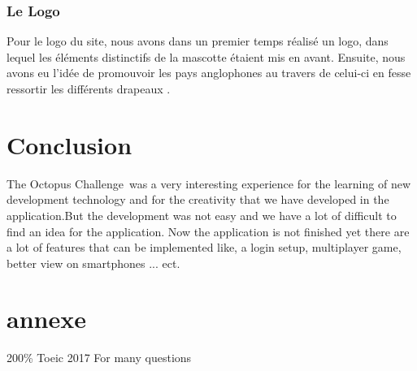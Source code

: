 \documentclass[a4paper,11pt, oneside]{book}
\def\appName{The Octopus Challenge}
\begin{document}
\subsection*{Le Logo}
Pour le logo du site, nous avons dans un premier temps réalisé un logo, dans lequel les éléments distinctifs de la mascotte étaient mis en avant.
Ensuite, nous avons eu l’idée de promouvoir les pays anglophones au travers de celui-ci en fesse ressortir les différents drapeaux .


\chapter{Conclusion}
\appName \ was a very interesting experience for the learning of new development technology and for the creativity that we have developed in the application.But the development was not easy and we have a lot of difficult to find an idea for the application. 
Now the application is not finished yet there are a lot of features that can be implemented like, a login setup, multiplayer game, better view on smartphones ... ect.

\chapter{annexe}
200\% Toeic 2017 For many questions
\end{document}
